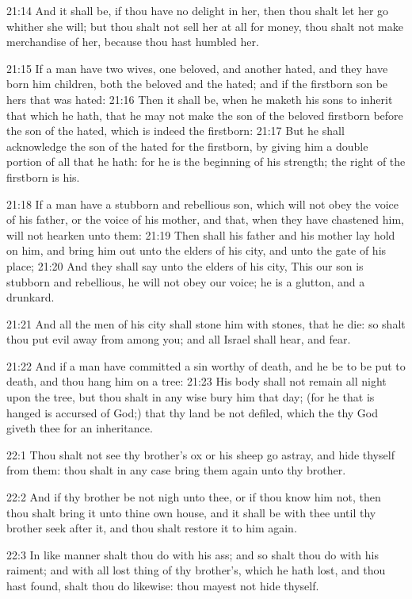 21:14 And it shall be, if thou have no delight in her, then thou shalt let her go whither she will; but thou shalt not sell her at all for money, thou shalt not make merchandise of her, because thou hast humbled her.

21:15 If a man have two wives, one beloved, and another hated, and they have born him children, both the beloved and the hated; and if the firstborn son be hers that was hated: 21:16 Then it shall be, when he maketh his sons to inherit that which he hath, that he may not make the son of the beloved firstborn before the son of the hated, which is indeed the firstborn: 21:17 But he shall acknowledge the son of the hated for the firstborn, by giving him a double portion of all that he hath: for he is the beginning of his strength; the right of the firstborn is his.

21:18 If a man have a stubborn and rebellious son, which will not obey the voice of his father, or the voice of his mother, and that, when they have chastened him, will not hearken unto them: 21:19 Then shall his father and his mother lay hold on him, and bring him out unto the elders of his city, and unto the gate of his place; 21:20 And they shall say unto the elders of his city, This our son is stubborn and rebellious, he will not obey our voice; he is a glutton, and a drunkard.

21:21 And all the men of his city shall stone him with stones, that he die: so shalt thou put evil away from among you; and all Israel shall hear, and fear.

21:22 And if a man have committed a sin worthy of death, and he be to be put to death, and thou hang him on a tree: 21:23 His body shall not remain all night upon the tree, but thou shalt in any wise bury him that day; (for he that is hanged is accursed of God;) that thy land be not defiled, which the \LORD thy God giveth thee for an inheritance.

22:1 Thou shalt not see thy brother's ox or his sheep go astray, and hide thyself from them: thou shalt in any case bring them again unto thy brother.

22:2 And if thy brother be not nigh unto thee, or if thou know him not, then thou shalt bring it unto thine own house, and it shall be with thee until thy brother seek after it, and thou shalt restore it to him again.

22:3 In like manner shalt thou do with his ass; and so shalt thou do with his raiment; and with all lost thing of thy brother's, which he hath lost, and thou hast found, shalt thou do likewise: thou mayest not hide thyself.

